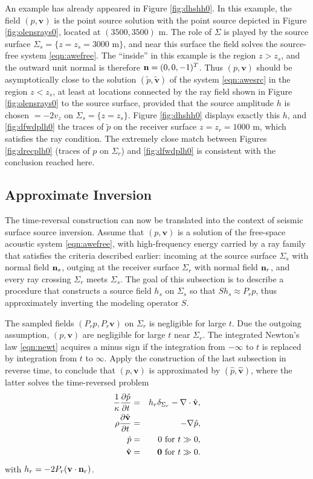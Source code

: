 \documentclass[georeport,12pt]{geophysics}
\newcommand{\bv}{\mathbf{v}}
\begin{document}
An example has already appeared in Figure \ref{fig:dhshh0}. In this
example, the field $(p, \bv)$ is the point source solution with the
point source depicted in Figure \ref{fig:olensrays0}, located at
$(3500, 3500)$ m. The role of $\Sigma$ is played by the source surface $\Sigma_s=
\{z=z_s=3000 \mbox{ m}\}$, and near this surface the field solves the source-free
system \ref{eqn:awefree}. The ``inside'' in this example is the region
$z > z_s$, and the outward unit normal is therefore ${\bf n}=(0,0,-1)^T$.
Thus $(p,\bv)$ should be asymptotically close to the solution
$(\tilde{p},\tilde{\bv})$ of the
system \ref{eqn:awesrc} in the region $z< z_s$, at least at locations
connected by the ray field shown in Figure \ref{fig:olensrays0} to the
source surface, provided that the source amplitude $h$ is chosen $=
-2v_z$ on $\Sigma_s=\{z=z_s\}$. Figure \ref{fig:dhshh0} displays exactly this $h$, and
\ref{fig:dfwdplh0} the traces of $\tilde{p}$ on the
  receiver surface $z=z_r=1000$ m, which satisfies the ray condition. The extremely
close match between Figures \ref{fig:drecplh0} (traces of $p$ on $\Sigma_r$) and
\ref{fig:dfwdplh0} is consistent with the conclusion reached here.

\subsection{Approximate Inversion}

The time-reversal construction can now be translated into the context
of seismic surface source inversion. Assume that $(p,\bv)$ is a
solution of the free-space acoustic system \ref{eqn:awefree}, with
high-frequency energy carried by a ray family that satisfies the
criteria described earlier: incoming at the source surface $\Sigma_s$
with normal field ${\bf n}_s$, outging at the receiver surface
$\Sigma_r$ with normal field ${\bf n}_r$, and every ray crossing
$\Sigma_r$ meets $\Sigma_s$. The goal of this subsection is to
describe a procedure that constructs a source field $h_s$ on
$\Sigma_s$ so that $Sh_s \approx P_rp$, thus approximately inverting
the modeling operator $S$.

The sampled fields $(P_rp,P_r\bv)$ on $\Sigma_r$
is negligible for large $t$. Due the outgoing assumption,
$(p,\bv)$ are negligible for large $t$ near $\Sigma_r$. The
integrated Newton's law \ref{eqn:newt} acquires a minus sign if the
integration from $-\infty$ to $t$ is replaced by integration from $t$
to $\infty$. Apply the construction of the last subsection in reverse
time, to conclude
that $(p,\bv)$ is approximated by $(\hat{p},\hat{\bv})$, where the
latter solves the time-reversed problem
\begin{eqnarray}
\label{eqn:awerecglob}
  \frac{1}{\kappa}\frac{\partial\hat{p}}{\partial t} & = & h_r \delta_{\Sigma_r}
                                                      - \nabla \cdot \hat{\bv}, \nonumber \\
  \rho\frac{\partial \hat{\bv}}{\partial t} & = & - \nabla \hat{p}, \nonumber \\
  \hat{p} & = & 0 \mbox{ for } t\gg 0, \nonumber \\
  \hat{\bv} & = & {\bf 0} \mbox{ for } t \gg 0.       
\end{eqnarray}
with $h_r = -2P_r(\bv \cdot {\bf n}_r)$.
\end{document}
